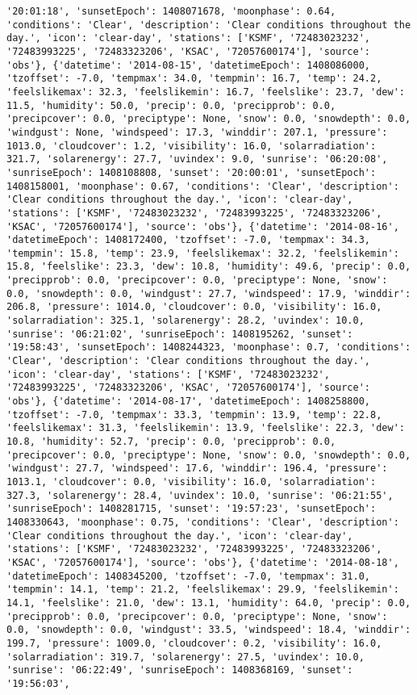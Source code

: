 \documentclass[
  letterpaper,
  DIV=11,
  numbers=noendperiod]{scrartcl}
\begin{document}
\begin{verbatim}
'20:01:18', 'sunsetEpoch': 1408071678, 'moonphase': 0.64, 'conditions': 'Clear', 'description': 'Clear conditions throughout the day.', 'icon': 'clear-day', 'stations': ['KSMF', '72483023232', '72483993225', '72483323206', 'KSAC', '72057600174'], 'source': 'obs'}, {'datetime': '2014-08-15', 'datetimeEpoch': 1408086000, 'tzoffset': -7.0, 'tempmax': 34.0, 'tempmin': 16.7, 'temp': 24.2, 'feelslikemax': 32.3, 'feelslikemin': 16.7, 'feelslike': 23.7, 'dew': 11.5, 'humidity': 50.0, 'precip': 0.0, 'precipprob': 0.0, 'precipcover': 0.0, 'preciptype': None, 'snow': 0.0, 'snowdepth': 0.0, 'windgust': None, 'windspeed': 17.3, 'winddir': 207.1, 'pressure': 1013.0, 'cloudcover': 1.2, 'visibility': 16.0, 'solarradiation': 321.7, 'solarenergy': 27.7, 'uvindex': 9.0, 'sunrise': '06:20:08', 'sunriseEpoch': 1408108808, 'sunset': '20:00:01', 'sunsetEpoch': 1408158001, 'moonphase': 0.67, 'conditions': 'Clear', 'description': 'Clear conditions throughout the day.', 'icon': 'clear-day', 'stations': ['KSMF', '72483023232', '72483993225', '72483323206', 'KSAC', '72057600174'], 'source': 'obs'}, {'datetime': '2014-08-16', 'datetimeEpoch': 1408172400, 'tzoffset': -7.0, 'tempmax': 34.3, 'tempmin': 15.8, 'temp': 23.9, 'feelslikemax': 32.2, 'feelslikemin': 15.8, 'feelslike': 23.3, 'dew': 10.8, 'humidity': 49.6, 'precip': 0.0, 'precipprob': 0.0, 'precipcover': 0.0, 'preciptype': None, 'snow': 0.0, 'snowdepth': 0.0, 'windgust': 27.7, 'windspeed': 17.9, 'winddir': 206.8, 'pressure': 1014.0, 'cloudcover': 0.0, 'visibility': 16.0, 'solarradiation': 325.1, 'solarenergy': 28.2, 'uvindex': 10.0, 'sunrise': '06:21:02', 'sunriseEpoch': 1408195262, 'sunset': '19:58:43', 'sunsetEpoch': 1408244323, 'moonphase': 0.7, 'conditions': 'Clear', 'description': 'Clear conditions throughout the day.', 'icon': 'clear-day', 'stations': ['KSMF', '72483023232', '72483993225', '72483323206', 'KSAC', '72057600174'], 'source': 'obs'}, {'datetime': '2014-08-17', 'datetimeEpoch': 1408258800, 'tzoffset': -7.0, 'tempmax': 33.3, 'tempmin': 13.9, 'temp': 22.8, 'feelslikemax': 31.3, 'feelslikemin': 13.9, 'feelslike': 22.3, 'dew': 10.8, 'humidity': 52.7, 'precip': 0.0, 'precipprob': 0.0, 'precipcover': 0.0, 'preciptype': None, 'snow': 0.0, 'snowdepth': 0.0, 'windgust': 27.7, 'windspeed': 17.6, 'winddir': 196.4, 'pressure': 1013.1, 'cloudcover': 0.0, 'visibility': 16.0, 'solarradiation': 327.3, 'solarenergy': 28.4, 'uvindex': 10.0, 'sunrise': '06:21:55', 'sunriseEpoch': 1408281715, 'sunset': '19:57:23', 'sunsetEpoch': 1408330643, 'moonphase': 0.75, 'conditions': 'Clear', 'description': 'Clear conditions throughout the day.', 'icon': 'clear-day', 'stations': ['KSMF', '72483023232', '72483993225', '72483323206', 'KSAC', '72057600174'], 'source': 'obs'}, {'datetime': '2014-08-18', 'datetimeEpoch': 1408345200, 'tzoffset': -7.0, 'tempmax': 31.0, 'tempmin': 14.1, 'temp': 21.2, 'feelslikemax': 29.9, 'feelslikemin': 14.1, 'feelslike': 21.0, 'dew': 13.1, 'humidity': 64.0, 'precip': 0.0, 'precipprob': 0.0, 'precipcover': 0.0, 'preciptype': None, 'snow': 0.0, 'snowdepth': 0.0, 'windgust': 33.5, 'windspeed': 18.4, 'winddir': 199.7, 'pressure': 1009.0, 'cloudcover': 0.2, 'visibility': 16.0, 'solarradiation': 319.7, 'solarenergy': 27.5, 'uvindex': 10.0, 'sunrise': '06:22:49', 'sunriseEpoch': 1408368169, 'sunset': '19:56:03', 
\end{verbatim}
\end{document}
